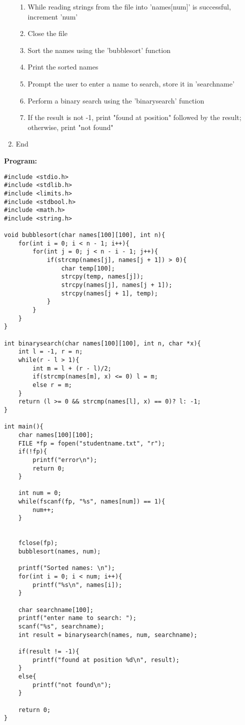 \documentclass{article}
\begin{document}
\begin{enumerate}
\begin{enumerate}
      \item While reading strings from the file into 'names[num]' is successful, increment 'num'
      \item Close the file
      \item Sort the names using the 'bubblesort' function
      \item Print the sorted names
      \item Prompt the user to enter a name to search, store it in 'searchname'
      \item Perform a binary search using the 'binarysearch' function
      \item If the result is not -1, print "found at position" followed by the result; otherwise, print "not found"
    \end{enumerate}
  \item End
\end{enumerate}


\textbf{Program:}
\begin{lstlisting}
#include <stdio.h>
#include <stdlib.h>
#include <limits.h>
#include <stdbool.h>
#include <math.h>
#include <string.h>

void bubblesort(char names[100][100], int n){
    for(int i = 0; i < n - 1; i++){
        for(int j = 0; j < n - i - 1; j++){
            if(strcmp(names[j], names[j + 1]) > 0){
                char temp[100];
                strcpy(temp, names[j]);
                strcpy(names[j], names[j + 1]);
                strcpy(names[j + 1], temp);
            }
        }
    }
}

int binarysearch(char names[100][100], int n, char *x){
    int l = -1, r = n;
    while(r - l > 1){
        int m = l + (r - l)/2;
        if(strcmp(names[m], x) <= 0) l = m;
        else r = m;
    }
    return (l >= 0 && strcmp(names[l], x) == 0)? l: -1;
}

int main(){
    char names[100][100];
    FILE *fp = fopen("studentname.txt", "r");
    if(!fp){
        printf("error\n");
        return 0;
    }

    int num = 0;
    while(fscanf(fp, "%s", names[num]) == 1){
        num++;
    }

     
    fclose(fp);
    bubblesort(names, num);

    printf("Sorted names: \n");
    for(int i = 0; i < num; i++){
        printf("%s\n", names[i]);
    }

    char searchname[100];
    printf("enter name to search: ");
    scanf("%s", searchname);
    int result = binarysearch(names, num, searchname); 

    if(result != -1){
        printf("found at position %d\n", result);
    }
    else{
        printf("not found\n");
    }

    return 0;
}
\end{lstlisting}
\end{document}
